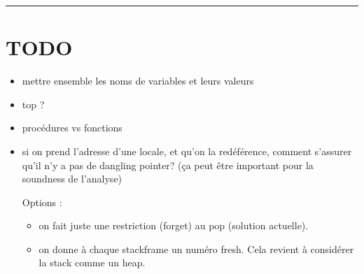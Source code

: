 \begin{center}\rule{3in}{0.4pt}\end{center}

\section*{TODO}

\begin{itemize}
\item mettre ensemble les noms de variables et leurs valeurs
\item top ?
\item procédures vs fonctions
\item
  si on prend l'adresse d'une locale, et qu'on la redéférence, comment s'assurer
  qu'il n'y a pas de dangling pointer? (ça peut être important pour la soundness
  de l'analyse)

  Options :

\begin{itemize}
\item
  on fait juste une restriction (forget) au pop (solution actuelle).
\item
  on donne à chaque stackframe un numéro fresh. Cela revient à considérer la
  stack comme un heap.
\end{itemize}

\end{itemize}

